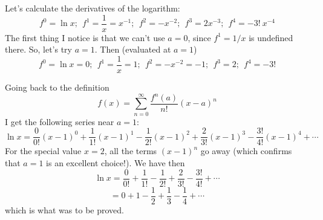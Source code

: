 \documentclass[11pt, oneside]{article}
\begin{document}
Let's calculate the derivatives of the logarithm:
\[ f^0 = \ln x; \ \ f^1 = \frac{1}{x} = x^{-1}; \ \ f^2 = -x^{-2}; \ \ f^3 = 2x^{-3}; \ \ f^4 = -3!\ x^{-4}  \]
The first thing I notice is that we can't use $a=0$, since $f^1 = 1/x$ is undefined there.  So, let's try $a=1$.  Then (evaluated at $a=1$)
\[ f^0 = \ln x = 0; \ \ f^1 = \frac{1}{x} = 1; \ \ f^2 = -x^{-2} = -1; \ \ f^3 = 2; \ \ f^4 = -3!  \]

Going back to the definition
\[ f(x) = \sum_{n=0}^\infty \frac{f^n(a)}{n!} (x-a)^n\]
I get the following series near $a = 1$:
\[ \ln x = \frac{0}{0!} (x-1)^0 +  \frac{1}{1!} (x-1)^1 - \frac{1}{2!} (x-1)^2 + \frac{2}{3!} (x-1)^3 - \frac{3!}{4!} (x-1)^4 + \cdots \]
For the special value $x=2$, all the terms $(x-1)^n$ go away (which confirms that $a=1$ is an excellent choice!).  We have then
\[ \ln x = \frac{0}{0!} +  \frac{1}{1!} - \frac{1}{2!} + \frac{2}{3!} - \frac{3!}{4!} + \cdots \]
\[ =  0 + 1 - \frac{1}{2} + \frac{1}{3} - \frac{1}{4} + \cdots \]
which is what was to be proved.
\end{document}
